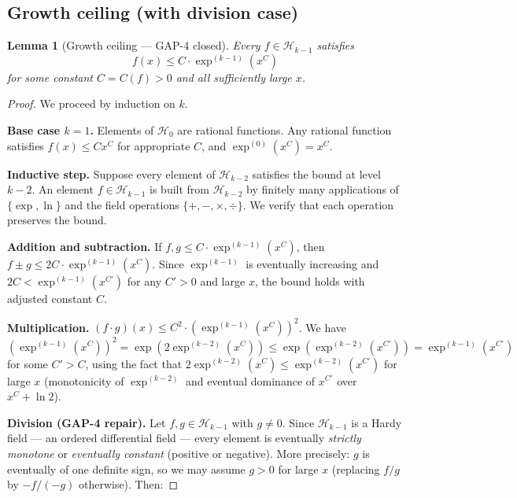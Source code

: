 \documentclass[12pt,a4paper]{article}
\newtheorem{lemma}[theorem]{Lemma}
\theoremstyle{definition}
\theoremstyle{remark}
\begin{document}
\subsection{Growth ceiling (with division case)}

\begin{lemma}[Growth ceiling --- GAP-4 closed]\label{lem:growthcap-full}
Every $f \in \mathcal{H}_{k-1}$ satisfies
\[
  f(x) \leq C \cdot \exp^{(k-1)}(x^C)
\]
for some constant $C = C(f) > 0$ and all sufficiently large $x$.
\end{lemma}

\begin{proof}
We proceed by induction on $k$.

\medskip
\noindent\textbf{Base case $k = 1$.}
Elements of $\mathcal{H}_0$ are rational functions.  Any rational function satisfies
$f(x) \leq C x^C$ for appropriate $C$, and $\exp^{(0)}(x^C) = x^C$.

\medskip
\noindent\textbf{Inductive step.}
Suppose every element of $\mathcal{H}_{k-2}$ satisfies the bound at level $k-2$.
An element $f \in \mathcal{H}_{k-1}$ is built from $\mathcal{H}_{k-2}$ by finitely many
applications of $\{\exp, \ln\}$ and the field operations $\{+, -, \times, \div\}$.
We verify that each operation preserves the bound.

\medskip
\noindent\textbf{Addition and subtraction.}
If $f, g \leq C \cdot \exp^{(k-1)}(x^C)$, then
$f \pm g \leq 2C \cdot \exp^{(k-1)}(x^C)$.
Since $\exp^{(k-1)}$ is eventually increasing and $2C < \exp^{(k-1)}(x^{C'})$
for any $C' > 0$ and large $x$, the bound holds with adjusted constant $C$.

\medskip
\noindent\textbf{Multiplication.}
$(f \cdot g)(x) \leq C^2 \cdot (\exp^{(k-1)}(x^C))^2$.
We have $(\exp^{(k-1)}(x^C))^2 = \exp(2\exp^{(k-2)}(x^C))
\leq \exp(\exp^{(k-2)}(x^{C'})) = \exp^{(k-1)}(x^{C'})$
for some $C' > C$, using the fact that $2 \exp^{(k-2)}(x^C) \leq \exp^{(k-2)}(x^{C'})$
for large $x$ (monotonicity of $\exp^{(k-2)}$ and eventual dominance of $x^{C'}$
over $x^C + \ln 2$).

\medskip
\noindent\textbf{Division (GAP-4 repair).}
Let $f, g \in \mathcal{H}_{k-1}$ with $g \neq 0$.  Since $\mathcal{H}_{k-1}$ is a
Hardy field --- an ordered differential field --- every element is eventually
\emph{strictly monotone} or \emph{eventually constant} (positive or negative).
More precisely: $g$ is eventually of one definite sign, so we may assume $g > 0$
for large $x$ (replacing $f/g$ by $-f/(-g)$ otherwise).  Then:


\end{proof}
\end{document}
